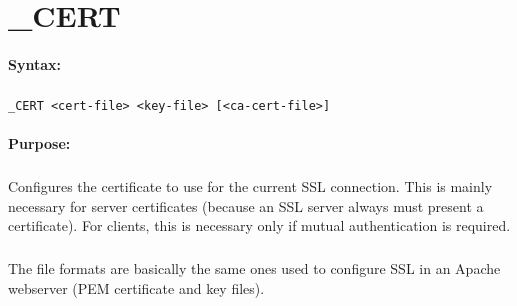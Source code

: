 
\newpage
\section{\_CERT}
\label{cmd:_CERT}

\paragraph{Syntax:}
\subparagraph{}
\texttt{\_CERT <cert-file> <key-file> [<ca-cert-file>]}

\paragraph{Purpose:}
\subparagraph{}
Configures the certificate to use for the current SSL connection. This 
is mainly necessary for server certificates (because an SSL server always 
must present a certificate). For clients, this is necessary only if mutual authentication 
is required.

\subparagraph{}
The file formats are basically the same ones used to configure 
SSL in an Apache webserver (PEM certificate and key files).

